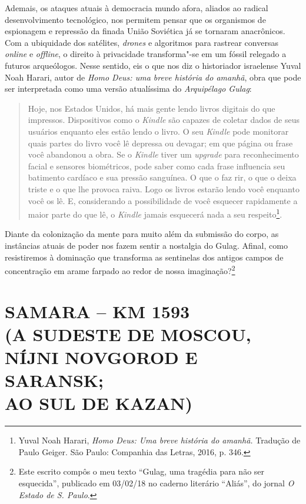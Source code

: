 Ademais, os ataques atuais à democracia mundo afora, aliados ao radical
desenvolvimento tecnológico, nos permitem pensar que os organismos de
espionagem e repressão da finada União Soviética já se tornaram
anacrônicos. Com a ubiquidade dos satélites, \emph{drones} e algoritmos
para rastrear conversas \emph{online} e \emph{offline}, o direito à
privacidade transforma"-se em um fóssil relegado a futuros arqueólogos.
Nesse sentido, eis o que nos diz o historiador israelense Yuval Noah
Harari, autor de \emph{Homo Deus: uma breve história do amanhã}, obra
que pode ser interpretada como uma versão atualíssima do
\emph{Arquipélago Gulag}:

\begin{quote}
Hoje, nos Estados Unidos, há mais gente lendo livros digitais do que
impressos. Dispositivos como o \emph{Kindle} são capazes de coletar
dados de seus usuários enquanto eles estão lendo o livro. O seu
\emph{Kindle} pode monitorar quais partes do livro você lê depressa ou
devagar; em que página ou frase você abandonou a obra. Se o
\emph{Kindle} tiver um \emph{upgrade} para reconhecimento facial e
sensores biométricos, pode saber como cada frase influencia seu
batimento cardíaco e sua pressão sanguínea. O que o faz rir, o que o
deixa triste e o que lhe provoca raiva. Logo os livros estarão lendo
você enquanto você os lê. E, considerando a possibilidade de você
esquecer rapidamente a maior parte do que lê, o \emph{Kindle} jamais
esquecerá nada a seu respeito\footnote{Yuval Noah Harari, \emph{Homo
  Deus: Uma breve história do amanhã.} Tradução de Paulo Geiger. São
  Paulo: Companhia das Letras, 2016, p. 346.}.
\end{quote}

Diante da colonização da mente para muito além da submissão do corpo, as
instâncias atuais de poder nos fazem sentir a nostalgia do Gulag.
Afinal, como resistiremos à dominação que transforma as sentinelas dos
antigos campos de concentração em arame farpado ao redor de nossa
imaginação?\footnote{Este escrito compôs o meu texto ``Gulag, uma
  tragédia para não ser esquecida'', publicado em 03/02/18 no caderno
  literário ``Aliás'', do jornal \emph{O Estado de S. Paulo}.}


\makeatletter\@openrightfalse
\movetooddpage
{}
\part*{SAMARA -- KM 1593\\(A SUDESTE DE MOSCOU,\\NÍJNI NOVGOROD E SARANSK;\\AO SUL DE KAZAN)}


